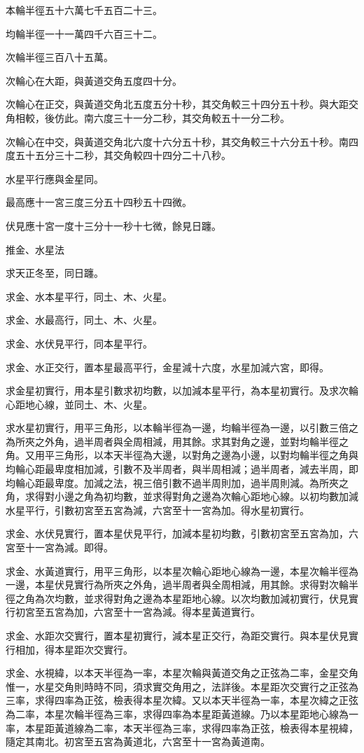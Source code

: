 \begin{pinyinscope}
本輪半徑五十六萬七千五百二十三。

均輪半徑一十一萬四千六百三十二。

次輪半徑三百八十五萬。

次輪心在大距，與黃道交角五度四十分。

次輪心在正交，與黃道交角北五度五分十秒，其交角較三十四分五十秒。與大距交角相較，後仿此。南六度三十一分二秒，其交角較五十一分二秒。

次輪心在中交，與黃道交角北六度十六分五十秒，其交角較三十六分五十秒。南四度五十五分三十二秒，其交角較四十四分二十八秒。

水星平行應與金星同。

最高應十一宮三度三分五十四秒五十四微。

伏見應十宮一度十三分十一秒十七微，餘見日躔。

推金、水星法

求天正冬至，同日躔。

求金、水本星平行，同土、木、火星。

求金、水最高行，同土、木、火星。

求金、水伏見平行，同本星平行。

求金、水正交行，置本星最高平行，金星減十六度，水星加減六宮，即得。

求金星初實行，用本星引數求初均數，以加減本星平行，為本星初實行。及求次輪心距地心線，並同土、木、火星。

求水星初實行，用平三角形，以本輪半徑為一邊，均輪半徑為一邊，以引數三倍之為所夾之外角，過半周者與全周相減，用其餘。求其對角之邊，並對均輪半徑之角。又用平三角形，以本天半徑為大邊，以對角之邊為小邊，以對均輪半徑之角與均輪心距最卑度相加減，引數不及半周者，與半周相減；過半周者，減去半周，即均輪心距最卑度。加減之法，視三倍引數不過半周則加，過半周則減。為所夾之角，求得對小邊之角為初均數，並求得對角之邊為次輪心距地心線。以初均數加減水星平行，引數初宮至五宮為減，六宮至十一宮為加。得水星初實行。

求金、水伏見實行，置本星伏見平行，加減本星初均數，引數初宮至五宮為加，六宮至十一宮為減。即得。

求金、水黃道實行，用平三角形，以本星次輪心距地心線為一邊，本星次輪半徑為一邊，本星伏見實行為所夾之外角，過半周者與全周相減，用其餘。求得對次輪半徑之角為次均數，並求得對角之邊為本星距地心線。以次均數加減初實行，伏見實行初宮至五宮為加，六宮至十一宮為減。得本星黃道實行。

求金、水距次交實行，置本星初實行，減本星正交行，為距交實行。與本星伏見實行相加，得本星距次交實行。

求金、水視緯，以本天半徑為一率，本星次輪與黃道交角之正弦為二率，金星交角惟一，水星交角則時時不同，須求實交角用之，法詳後。本星距次交實行之正弦為三率，求得四率為正弦，檢表得本星次緯。又以本天半徑為一率，本星次緯之正弦為二率，本星次輪半徑為三率，求得四率為本星距黃道線。乃以本星距地心線為一率，本星距黃道線為二率，本天半徑為三率，求得四率為正弦，檢表得本星視緯，隨定其南北。初宮至五宮為黃道北，六宮至十一宮為黃道南。


\end{pinyinscope}
